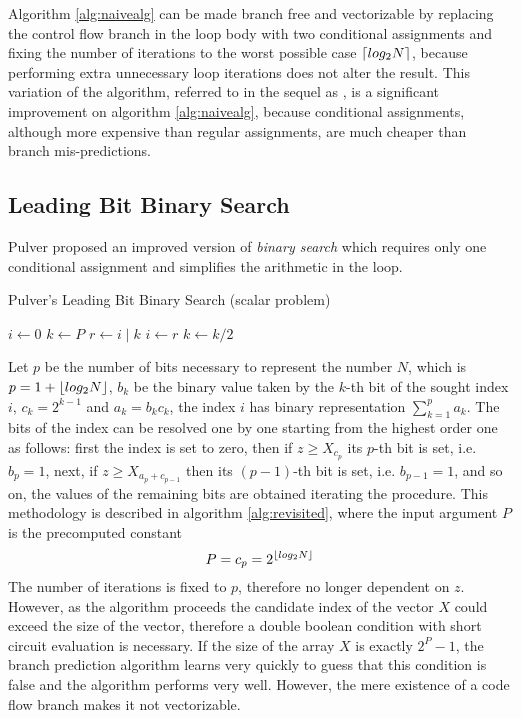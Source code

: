 \documentclass[preprint,1p,times]{elsarticle}
\begin{document}
Algorithm \ref{alg:naivealg} can be made branch free and vectorizable by replacing the control flow branch in the loop body with two conditional assignments and fixing the number of iterations to the worst possible case $\left \lceil log_2N \right \rceil$, because performing extra unnecessary loop iterations does not alter the result. 
This variation of the algorithm, referred to in the sequel as \textit{\ClassicModName}, is a significant improvement on algorithm \ref{alg:naivealg}, because conditional assignments, although more expensive than regular assignments, are much cheaper than branch mis-predictions.

\subsection{Leading Bit Binary Search}
\label{sec:optimbinary}

Pulver \cite{Pulver2011} proposed an improved version of \textit{binary search} which requires only one conditional assignment and simplifies the arithmetic in the loop.

\begin{algorithm}[ht]
	\caption{Pulver's Leading Bit Binary Search (scalar problem)}
	\label{alg:revisited}
	\begin{algorithmic}
		 
		\State $i \leftarrow 0$
		\State $k \leftarrow P$
		\Repeat
		\State $r \leftarrow i\;|\;k$ 
		 
		\State $i \leftarrow r$
		\EndIf
		\State $k \leftarrow k / 2$ 
		\EndFunction
	\end{algorithmic}
\end{algorithm}

Let $p$ be the number of bits necessary to represent the number $N$, which is $p=1+\left \lfloor  log_2 N  \right \rfloor$,
    $b_k$ be the binary value taken by the $k$-th bit of the sought index $i$,
    $c_k = 2^{k-1}$
    and $a_k = b_kc_k$,
the index $i$ has binary representation $\sum_{k=1}^{p}a_k$.
The bits of the index can be resolved one by one starting from the highest order one as follows:
first the index is set to zero, then if $z \geq X_{c_p}$ its $p$-th bit is set, i.e. $b_p=1$,
next, if $z \geq X_{a_p+c_{p-1}}$ then its $(p-1)$-th bit is set, i.e. $b_{p-1}=1$, 
and so on, the values of the remaining bits are obtained iterating the procedure.
This methodology is described in algorithm \ref{alg:revisited}, where the input argument $P$ is the precomputed constant $$P=c_p=2^{\left \lfloor  log_2 N  \right \rfloor}$$
The number of iterations is fixed to $p$, therefore no longer dependent on $z$. However,
as the algorithm proceeds the candidate index of the vector $X$ could exceed the
size of the vector, therefore a double boolean condition with short circuit evaluation is necessary. If the size of the array $X$ is exactly $2^P-1$, the branch prediction algorithm learns very quickly to guess that this condition is false and the algorithm performs very well. However, the mere existence of a code flow branch makes it not vectorizable.
\end{document}
